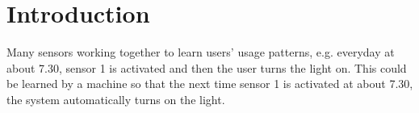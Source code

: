 \chapter{Introduction}\label{part:introduction}


Many sensors working together to learn users’ usage patterns, e.g. everyday at about 7.30, sensor 1 is activated and then the user turns the light on. This could be learned by a machine so that the next time sensor 1 is activated at about 7.30, the system automatically turns on the light.
